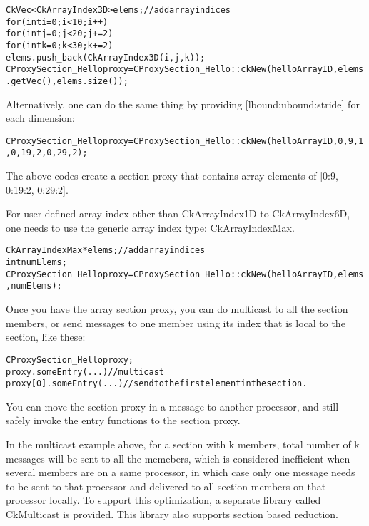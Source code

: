 \begin{alltt}
  CkVec<CkArrayIndex3D> elems;    // add array indices
  for (int i=0; i<10; i++)
    for (int j=0; j<20; j+=2)
      for (int k=0; k<30; k+=2)
         elems.push_back(CkArrayIndex3D(i, j, k));
  CProxySection_Hello proxy = CProxySection_Hello::ckNew(helloArrayID, elems.getVec(), elems.size());
\end{alltt}

Alternatively, one can do the same thing by providing [lbound:ubound:stride] 
for each dimension:

\begin{alltt}
  CProxySection_Hello proxy = CProxySection_Hello::ckNew(helloArrayID, 0, 9, 1, 0, 19, 2, 0, 29, 2);
\end{alltt}

The above codes create a section proxy that contains array elements of 
[0:9, 0:19:2, 0:29:2].

For user-defined array index other than CkArrayIndex1D to CkArrayIndex6D,
one needs to use the generic array index type: CkArrayIndexMax.

\begin{alltt}
  CkArrayIndexMax *elems;    // add array indices
  int numElems;
  CProxySection_Hello proxy = CProxySection_Hello::ckNew(helloArrayID, elems, numElems);
\end{alltt}

Once you have the array section proxy, you can do multicast to all the 
section members, or send messages to one member using its index that
is local to the section, like these:

\begin{alltt}
  CProxySection_Hello proxy;
  proxy.someEntry(...)          // multicast
  proxy[0].someEntry(...)       // send to the first element in the section.
\end{alltt}

You can move the section proxy in a message to another processor, and still 
safely invoke the entry functions to the section proxy.

In the multicast example above, for a section with k members, total number 
of k messages will be sent to all the memebers, which is considered 
inefficient when several members are on a same processor, in which 
case only one message needs to be sent to that processor and delivered to
all section members on that processor locally. To support this optimization,
a separate library called CkMulticast is provided. This library also supports
section based reduction.

